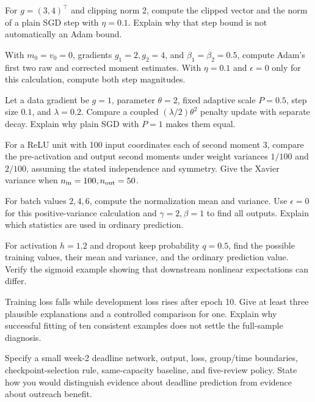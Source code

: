 \begin{exercises}
\item {}For $g=(3,4)^\top$ and clipping norm 2, compute the clipped vector and the norm of a plain SGD step with $\eta=0.1$. Explain why that step bound is not automatically an Adam bound.
\item {}With $m_0=v_0=0$, gradients $g_1=2,g_2=4$, and $\beta_1=\beta_2=0.5$, compute Adam's first two raw and corrected moment estimates. With $\eta=0.1$ and $\epsilon=0$ only for this calculation, compute both step magnitudes.
\item {}Let a data gradient be $g=1$, parameter $\theta=2$, fixed adaptive scale $P=0.5$, step size $0.1$, and $\lambda=0.2$. Compare a coupled $(\lambda/2)\theta^2$ penalty update with separate decay. Explain why plain SGD with $P=1$ makes them equal.
\item {}For a ReLU unit with 100 input coordinates each of second moment 3, compare the pre-activation and output second moments under weight variances $1/100$ and $2/100$, assuming the stated independence and symmetry. Give the Xavier variance when $n_{\rm in}=100,n_{\rm out}=50$.
\item {}For batch values $2,4,6$, compute the normalization mean and variance. Use $\epsilon=0$ for this positive-variance calculation and $\gamma=2,\beta=1$ to find all outputs. Explain which statistics are used in ordinary prediction.
\item {}For activation $h=1.2$ and dropout keep probability $q=0.5$, find the possible training values, their mean and variance, and the ordinary prediction value. Verify the sigmoid example showing that downstream nonlinear expectations can differ.
\item {}Training loss falls while development loss rises after epoch 10. Give at least three plausible explanations and a controlled comparison for one. Explain why successful fitting of ten consistent examples does not settle the full-sample diagnosis.
\item {}Specify a small week-2 deadline network, output, loss, group/time boundaries, checkpoint-selection rule, same-capacity baseline, and five-review policy. State how you would distinguish evidence about deadline prediction from evidence about outreach benefit.
\end{exercises}

